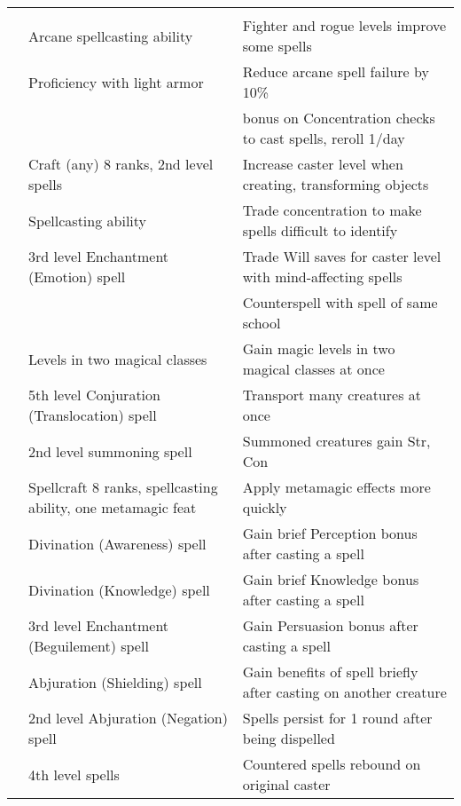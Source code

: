 {\begin{longtabu}{>{\lcol}p{15em} >{\lcol}p{15em} >{\lcol}X}
\midrule
{} &  &  \\
 & Arcane spellcasting ability & Fighter and rogue levels improve some spells \\ 
 & Proficiency with light armor & Reduce arcane spell failure by 10\% \\
 & \x &   bonus on Concentration checks to cast spells, reroll 1/day \\
 & Craft (any) 8 ranks, 2nd level spells & Increase caster level when creating, transforming objects \\
 & Spellcasting ability & Trade concentration to make spells difficult to identify \\
 & 3rd level Enchantment (Emotion) spell & Trade Will saves for caster level with mind-affecting spells \\
 & \x &  Counterspell with spell of same school \\
 & Levels in two magical classes & Gain magic levels in two magical classes at once \\
 & 5th level Conjuration (Translocation) spell & Transport many creatures at once \\ 
 & 2nd level summoning spell & Summoned creatures gain  Str,  Con \\
 & Spellcraft 8 ranks, spellcasting ability, one metamagic feat & Apply metamagic effects more quickly \\
 & Divination (Awareness) spell & Gain brief Perception bonus after casting a spell \\
 & Divination (Knowledge) spell & Gain brief Knowledge bonus after casting a spell \\
 & 3rd level Enchantment (Beguilement) spell & Gain Persuasion bonus after casting a spell \\
 & Abjuration (Shielding) spell & Gain benefits of spell briefly after casting on another creature \\
 & 2nd level Abjuration (Negation) spell & Spells persist for 1 round after being dispelled \\
 &  4th level spells & Countered spells rebound on original caster \\

\end{longtabu}}
